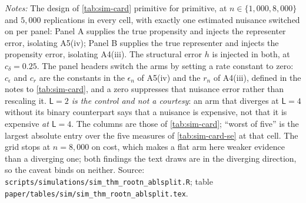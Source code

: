 \documentclass[
  12pt]{article}
\newcommand{\1}[1]{\mathds{1}\left[#1\right]}
\theoremstyle{plain}
\theoremstyle{definition}
\theoremstyle{definition}
\theoremstyle{remark}
\begin{document}
\begin{table}[!htbp]
\centering
\begin{threeparttable}
\caption{Which nuisance carries the divergence}
\label{tab:sim-ablsplit}
\footnotesize

\begin{tablenotes}\footnotesize
\item \textit{Notes:} The design of \cref{tab:sim-card} primitive for primitive,
at $n\in\{1{,}000,8{,}000\}$ and $5{,}000$ replications in every cell, with
exactly one estimated nuisance switched on per panel: Panel A supplies the true
propensity and injects the representer error, isolating A5(iv); Panel B supplies
the true representer and injects the propensity error, isolating A4(iii). The
structural error $h$ is injected in both, at $c_\delta=0.25$. The panel headers
switch the arms by setting a rate constant to zero: $c_\epsilon$ and $c_r$ are
the constants in the $\epsilon_n$ of A5(iv) and the $r_n$ of A4(iii), defined in
the notes to \cref{tab:sim-card}, and a zero suppresses that nuisance error
rather than rescaling it. \emph{$\mathsf L=2$
is the control and not a courtesy}: an arm that diverges at $\mathsf L=4$ without
its binary counterpart says that a nuisance is expensive, not that it is
expensive \emph{at $\mathsf L=4$}. The columns are those of \cref{tab:sim-card};
``worst of five'' is the largest absolute entry over the five measures of
\cref{tab:sim-card-se} at that cell. The grid stops at $n=8{,}000$ on cost, which
makes a flat arm here weaker evidence than a diverging one; both findings the
text draws are in the diverging direction, so the caveat binds on neither. Source:
\texttt{scripts/simulations/sim\_thm\_rootn\_ablsplit.R}; table
\texttt{paper/tables/sim/sim\_thm\_rootn\_ablsplit.tex}.
\end{tablenotes}
\end{threeparttable}
\end{table}
\end{document}
